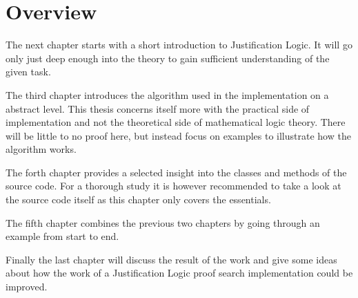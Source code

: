 \section{Overview}
The next chapter starts with a short introduction to Justification Logic. It will go only just deep enough into the theory to gain sufficient understanding of the given task.

The third chapter introduces the algorithm used in the implementation on a abstract level. This thesis concerns itself more with the practical side of implementation and not the theoretical side of mathematical logic theory. There will be little to no proof here, but instead focus on examples to illustrate how the algorithm works.

The forth chapter provides a selected insight into the classes and methods of the source code. For a thorough study it is however recommended to take a look at the source code itself as this chapter only covers the essentials. 

The fifth chapter combines the previous two chapters by going through an example from start to end.

Finally the last chapter will discuss the result of the work and give some ideas about how the work of a Justification Logic proof search implementation could be improved.